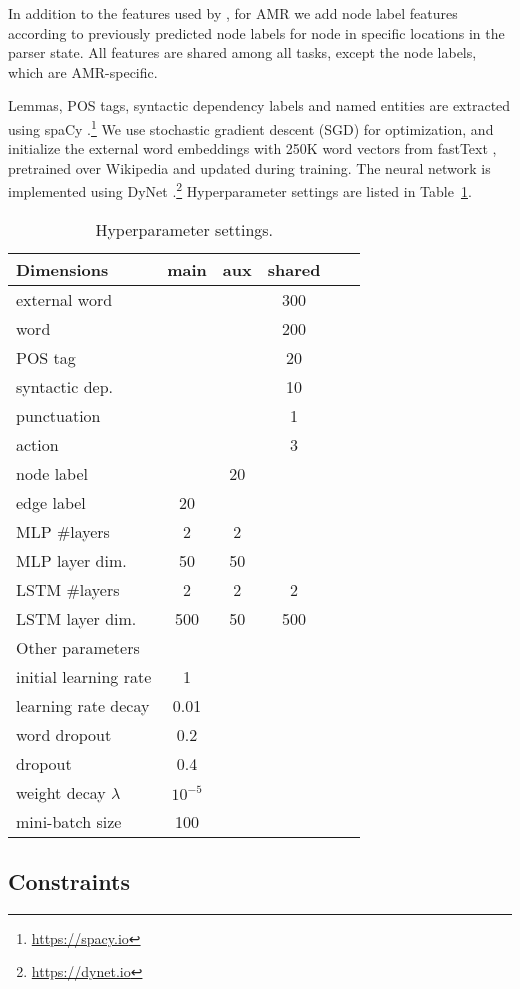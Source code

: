 \documentclass[11pt,a4paper]{article}
\begin{document}
In addition to the features used by \citet{hershcovich2017a},
for AMR we add node label features according to
previously predicted node labels for node in specific locations in the parser state.
All features are shared among all tasks, except the node labels, which are
AMR-specific.

Lemmas, POS tags, syntactic dependency labels and named entities are extracted using spaCy
\cite{spacy2}.\footnote{\url{https://spacy.io}}
We use stochastic gradient descent (SGD) for optimization,
and initialize the external word embeddings with 250K word vectors from fastText
\cite{bojanowski2016enriching}, pretrained over Wikipedia and updated during training.
The neural network is implemented using DyNet \cite{neubig2017dynet}.\footnote{\url{https://dynet.io}}
Hyperparameter settings are listed in Table~\ref{tab:hyperparams}.

\begin{table}
\begin{tabular}{l|ccccc}
\hline
\footnotesize Dimensions &  main & aux & shared \\
\hline
external word & & & 300 \\
word & & & 200 \\
POS tag & & & 20 \\
syntactic dep. & & & 10 \\
punctuation & & & 1 \\
action & & & 3 \\
node label & & 20 \\
edge label & 20 \\
MLP \#layers & 2 & 2 \\
MLP layer dim. & 50 & 50 \\
LSTM \#layers & 2 & 2 & 2 \\
LSTM layer dim. & 500 & 50 & 500 \\
\hline\hline
\footnotesize Other parameters \\
\hline
initial learning rate & 1 \\
learning rate decay & 0.01 \\
word dropout & 0.2 \\
dropout & 0.4 \\
weight decay $\lambda$ & $10^{-5}$ \\
mini-batch size & 100
\end{tabular}
\caption{Hyperparameter settings.\label{tab:hyperparams}}
\end{table}


\subsection{Constraints}
\end{document}
